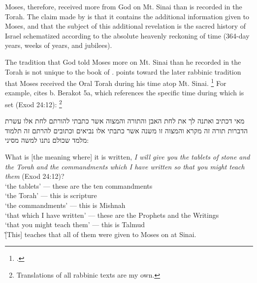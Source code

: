 Moses, therefore, received more from God on Mt. Sinai than is recorded in the Torah. The claim made by \jub is that it contains the additional information given to Moses, and that the subject of this additional revelation is the sacred history of Israel schematized according to the absolute heavenly reckoning of time (364-day years, weeks of years, and jubilees).

The tradition that God told Moses more on Mt. Sinai than he recorded in the Torah is not unique to the book of \jub. \vanderkam points toward the later rabbinic tradition that Moses received the Oral Torah during his time atop Mt. Sinai.%
    \footnote{\cite[28--31]{vanderkam_metso-etal2010}.}
For example, \vanderkam cites b. Berakot 5a, which references the specific time during which \jub is set (Exod 24:12):%
    \footnote{Translations of all rabbinic texts are my own.}

\begin{aramaictranslation}
    מאי דכתיב ואתנה לך את לחת האבן והתורה והמצוה אשר כתבתי להורתם לחת אלו עשרת הדברות תורה זה מקרא והמצוה זו משנה אשר כתבתי אלו נביאים וכתובים להרתם זה תלמוד מלמד שכולם נתנו למשה מסיני: 
\end{aramaictranslation}

\begin{translation}
    What is [the meaning where] it is written, \emph{I will give you the tablets of stone and the Torah and the commandments which I have written so that you might teach them} (Exod 24:12)?\\
    \-\hspace{2em}`the tablets' --- these are the ten commandments\\
    \-\hspace{2em}`the Torah' --- this is scripture\\
    \-\hspace{2em}`the commandments' --- this is Mishnah\\
    \-\hspace{2em}`that which I have written' --- these are the Prophets and the Writings\\
    \-\hspace{2em}`that you might teach them' --- this is Talmud\\\~
    [This] teaches that all of them were given to Moses on at Sinai.
\end{translation}

